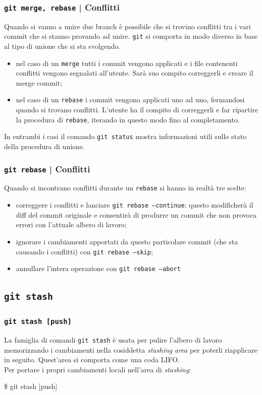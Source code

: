 \documentclass{beamer}
\begin{document}
\begin{frame}
  \label{conflict}
  \frametitle{\texttt{git merge, rebase} | Conflitti}
  Quando si vanno a unire due branch \`e possibile che si trovino conflitti tra
  i vari commit che si stanno provando ad unire. \texttt{git} si comporta in modo diverso
  in base al tipo di unione che si sta svolgendo.
  \begin{itemize}
    \item<1-> nel caso di un \texttt{merge} tutti i commit vengono applicati e 
      i file contenenti conflitti vengono segnalati all'utente. Sar\`a suo
      compito correggerli e creare il merge commit;
    \item<2-> nel caso di un \texttt{rebase} i commit vengono applicati uno ad
      uno, fermandosi quando si trovano conflitti. L'utente ha il compito di
      correggerli e far ripartire la procedura di \texttt{rebase}, iterando
      in questo modo fino al completamento.
  \end{itemize}
  In entrambi i casi il comando \texttt{git status} mostra informazioni utili
  sullo stato della procedura di unione.
\end{frame}

\begin{frame}
  \label{conflict-end}
  \frametitle{\texttt{git rebase} | Conflitti}
  Quando si incontrano conflitti durante un \texttt{rebase} si hanno in
  realt\`a tre scelte:
  \begin{itemize}
    \item<1-> correggere i conflitti e lanciare \texttt{git rebase --continue}: questo
      modificher\`a il diff del commit originale e consentir\`a di produrre un
      commit che non provoca errori con l'attuale albero di lavoro;
    \item<2-> ignorare i cambiamenti apportati da questo particolare commit (che
      sta causando i conflitti) con \texttt{git rebase --skip};
    \item<3-> annullare l'intera operazione con \texttt{git rebase --abort}
  \end{itemize}
\end{frame}

\subsection{\texttt{git stash}}
\begin{frame}
  \frametitle{\texttt{git stash [push]}}
  La famiglia di comandi \texttt{git stash} \`e usata per pulire l'albero di
  lavoro memorizzando i cambiamenti nella cosiddetta \emph{stashing area} per
  poterli riapplicare in seguito. Quest'area si comporta come una coda LIFO. \\
  Per portare i propri cambiamenti locali nell'area di \emph{stashing}:
  \begin{semiverbatim}
  \$ git stash [push]
  \end{semiverbatim}
\end{frame}
\end{document}
